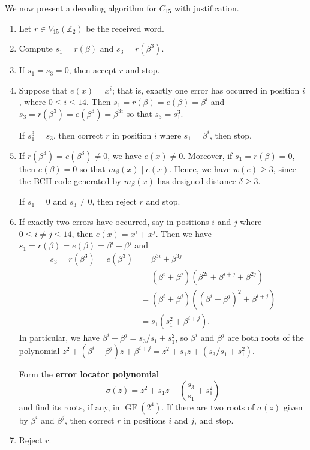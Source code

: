 \documentclass[10pt]{article}
\newcommand{\Z}{\mathbb{Z}}
\DeclareMathOperator{\GF}{GF}
\theoremstyle{newstyle}
\begin{document}
We now present a decoding algorithm for $C_{15}$ with justification. 
\begin{enumerate}[(1)]
    \item Let $r \in V_{15}(\Z_2)$ be the received word. 
    \item Compute $s_1 = r(\beta)$ and $s_3 = r(\beta^3)$. 
    \item If $s_1 = s_3 = 0$, then accept $r$ and stop. 
    \item Suppose that $e(x) = x^i$; that is, exactly one error has occurred in position $i$, 
    where $0 \leq i \leq 14$. Then $s_1 = r(\beta) = e(\beta) = \beta^i$ and 
    $s_3 = r(\beta^3) = e(\beta^3) = \beta^{3i}$ so that $s_3 = s_1^3$. 
    
    If $s_1^3 = s_3$, then correct $r$ in position $i$ where $s_1 = \beta^i$, then stop. 
    \item If $r(\beta^3) = e(\beta^3) \neq 0$, we have $e(x) \neq 0$. Moreover, if 
    $s_1 = r(\beta) = 0$, then $e(\beta) = 0$ so that $m_\beta(x) \mid e(x)$. 
    Hence, we have $w(e) \geq 3$, since the BCH code generated by $m_\beta(x)$ has 
    designed distance $\delta \geq 3$. 
    
    If $s_1 = 0$ and $s_3 \neq 0$, then reject $r$ and stop. 
    \item If exactly two errors have occurred, say in positions $i$ and $j$ where 
    $0 \leq i \neq j \leq 14$, then $e(x) = x^i+x^j$. Then we have $s_1 = r(\beta) = 
    e(\beta) = \beta^i + \beta^j$ and 
    \begin{align*}
        s_3 = r(\beta^3) = e(\beta^3) 
        &= \beta^{3i} + \beta^{3j} \\
        &= (\beta^i + \beta^j)(\beta^{2i} + \beta^{i+j} + \beta^{2j}) \\
        &= (\beta^i + \beta^j)((\beta^i+\beta^j)^2 + \beta^{i+j}) \\
        &= s_1(s_1^2 + \beta^{i+j}). 
    \end{align*}
    In particular, we have $\beta^i+\beta^j = s_3/s_1 + s_1^2$, so $\beta^i$ and 
    $\beta^j$ are both roots of the polynomial 
    $z^2 + (\beta^i+\beta^j)z + \beta^{i+j} = z^2 + s_1z + (s_3/s_1 + s_1^2)$. 
    
    Form the {\bf error locator polynomial} 
    \[ \sigma(z) = z^2 + s_1z + \left( \frac{s_3}{s_1} + s_1^2 \right) \]
    and find its roots, if any, in $\GF(2^4)$. If there are two roots of $\sigma(z)$ given by $\beta^i$ 
    and $\beta^j$, then correct $r$ in positions $i$ and $j$, and stop. 
    \item Reject $r$. 
\end{enumerate}
\end{document}
